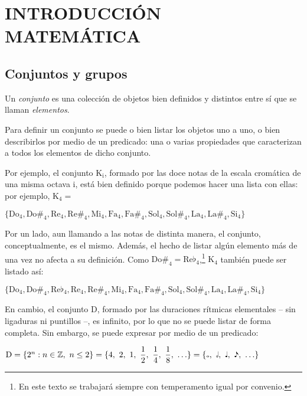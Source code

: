 \section{INTRODUCCI\'ON MATEM\'ATICA}\label{ch:permutaciones}
	\subsection{Conjuntos y grupos}
		Un \emph{conjunto} es una colecci\'on de objetos bien definidos y distintos entre s\'i que se llaman \emph{elementos}. 
	
		Para definir un conjunto se puede o bien listar los objetos uno a uno, o bien describirlos por medio de un predicado: una o varias propiedades que caracterizan a todos los elementos de dicho conjunto.

		Por ejemplo, el conjunto K$_{\mbox{i}}$, formado por las doce notas de la escala crom\'atica de una misma octava i, est\'a bien definido porque podemos hacer una lista con ellas: por ejemplo, $\mbox{K}_{\mbox{4}} = $
		
		{$\{\mbox{Do}_{\mbox{4}}, \mbox{Do\#}_{\mbox{4}}, \mbox{Re}_{\mbox{4}}, \mbox{Re\#}_{\mbox{4}}, \mbox{Mi}_{\mbox{4}}, \mbox{Fa}_{\mbox{4}}, \mbox{Fa\#}_{\mbox{4}}, \mbox{Sol}_{\mbox{4}}, \mbox{Sol\#}_{\mbox{4}}, \mbox{La}_{\mbox{4}}, \mbox{La\#}_{\mbox{4}}, \mbox{Si}_{\mbox{4}}\}$}
		
		Por un lado, aun llamando a las notas de distinta manera, el conjunto, conceptualmente, es el mismo. Adem\'as, el hecho de listar alg\'un elemento m\'as de una vez no afecta a su definici\'on. Como $\mbox{Do\#}_{\mbox{4}} = \mbox{Re}\flat_{\mbox{4}}$,\footnote{En este texto se trabajar\'a siempre con temperamento igual por convenio.}  $\mbox{K}_{\mbox{4}}$ tambi\'en puede ser listado as\'i:
		
		{$\{\mbox{Do}_{\mbox{4}}, \mbox{Do\#}_{\mbox{4}}, \mbox{Re}\flat_{\mbox{4}}, \mbox{Re}_{\mbox{4}}, \mbox{Re\#}_{\mbox{4}}, \mbox{Mi}_{\mbox{4}}, \mbox{Fa}_{\mbox{4}}, \mbox{Fa\#}_{\mbox{4}}, \mbox{Sol}_{\mbox{4}}, \mbox{Sol\#}_{\mbox{4}}, \mbox{La}_{\mbox{4}}, \mbox{La\#}_{\mbox{4}}, \mbox{Si}_{\mbox{4}}\}$}
	
		En cambio, el conjunto D, formado por las duraciones r\'itmicas elementales -- sin ligaduras ni puntillos --, es infinito, por lo que no se puede listar de forma completa. Sin embargo, se puede expresar por medio de un predicado:
		
		{$\mbox{D} =\{2^n:n\in\mathbb{Z},\ n\le 2\} = \{4,\ 2,\ 1,\ \dfrac{1}{2},\ \dfrac{1}{4},\ \dfrac{1}{8},\ \ldots\} = \{\fullnote,\ \halfnote,\ \quarternote,\ \eighthnote,\ \ldots\}$}
		
